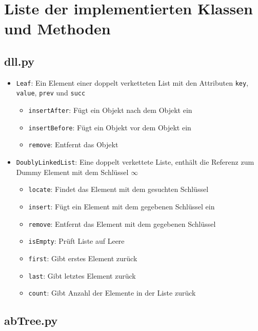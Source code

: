 \chapter{Liste der implementierten Klassen und Methoden}
\label{appendix:classes}
\section{dll.py}

\begin{itemize}

    \item \texttt{Leaf}: Ein Element einer doppelt verketteten List mit den Attributen \texttt{key}, \texttt{value}, \texttt{prev} und \texttt{succ}

    \begin{itemize}
        \item \texttt{insertAfter}: Fügt ein Objekt nach dem Objekt ein
        \item \texttt{insertBefore}: Fügt ein Objekt vor dem Objekt ein
        \item \texttt{remove}: Entfernt das Objekt
    \end{itemize}

    \item \texttt{DoublyLinkedList}: Eine doppelt verkettete Liste, enthält die Referenz zum Dummy Element mit dem Schlüssel $\infty$

    \begin{itemize}
        \item \texttt{locate}: Findet das Element mit dem gesuchten Schlüssel
        \item \texttt{insert}: Fügt ein Element mit dem gegebenen Schlüssel ein
        \item \texttt{remove}: Entfernt das Element mit dem gegebenen Schlüssel
        \item \texttt{isEmpty}: Prüft Liste auf Leere
        \item \texttt{first}: Gibt erstes Element zurück
        \item \texttt{last}: Gibt letztes Element zurück
        \item \texttt{count}: Gibt Anzahl der Elemente in der Liste zurück
    \end{itemize}

\end{itemize}

\section{abTree.py}

